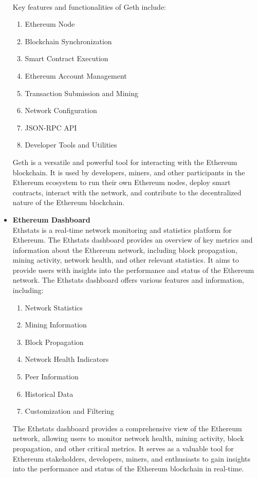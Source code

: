 \documentclass[oneside, 12pt]{book}
\begin{document}
\begin{itemize}
	\\Key features and functionalities of Geth include:
	\begin{enumerate}
		\item Ethereum Node
		\item Blockchain Synchronization
		\item Smart Contract Execution
		\item Ethereum Account Management
		\item Transaction Submission and Mining
		\item Network Configuration
		\item JSON-RPC API
		\item Developer Tools and Utilities
	\end{enumerate}
	Geth is a versatile and powerful tool for interacting with the Ethereum blockchain. It is used by developers, miners, and other participants in the Ethereum ecosystem to run their own Ethereum nodes, deploy smart contracts, interact with the network, and contribute to the decentralized nature of the Ethereum blockchain.
	\item\textbf{Ethereum Dashboard}
	\\Ethstats is a real-time network monitoring and statistics platform for Ethereum. The Ethstats dashboard provides an overview of key metrics and information about the Ethereum network, including block propagation, mining activity, network health, and other relevant statistics. It aims to provide users with insights into the performance and status of the Ethereum network.
	\newpage	
	The Ethstats dashboard offers various features and information, including:
	\begin{enumerate}
		\item Network Statistics
		\item Mining Information
		\item Block Propagation
		\item Network Health Indicators
		\item Peer Information
		\item Historical Data
		\item Customization and Filtering
	\end{enumerate}
	The Ethstats dashboard provides a comprehensive view of the Ethereum network, allowing users to monitor network health, mining activity, block propagation, and other critical metrics. It serves as a valuable tool for Ethereum stakeholders, developers, miners, and enthusiasts to gain insights into the performance and status of the Ethereum blockchain in real-time.
\end{itemize}
\end{document}
